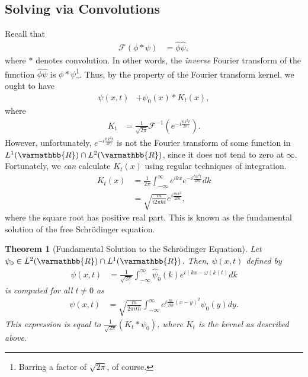 \documentclass[12pt]{extarticle}
\newcommand{\R}{\varmathbb{R}}
\theoremstyle{plain}
\newtheorem*{theorem}{Theorem}%
\theoremstyle{definition}
\theoremstyle{remark}
\begin{document}
  \subsection{Solving via Convolutions}%
  Recall that
  \begin{align*}
    \mathcal{F}(\phi \ast \psi) &= \hat{\phi}\hat{\psi},
  \end{align*}
  where $\ast$ denotes convolution. In other words, the \textit{inverse} Fourier transform of the function $\hat{\phi}\hat{\psi}$ is $\phi \ast \psi$\footnote{Barring a factor of $\sqrt{2\pi}$, of course.}. Thus, by the property of the Fourier transform kernel, we ought to have
  \begin{align*}
    \psi(x,t) &+ \psi_0(x)\ast K_t(x),
  \end{align*}
  where
  \begin{align*}
    K_t &= \frac{1}{\sqrt{2\pi}}\mathcal{F}^{-1}\left(e^{-i\frac{\hbar k^2 t}{2m}}\right).
  \end{align*}
  However, unfortunately, $e^{-i\frac{\hbar k^2 t}{2m}}$ is not the Fourier transform of some function in $L^{1}(\R)\cap L^{2}(\R)$, since it does not tend to zero at $\infty$. Fortunately, we \textit{can} calculate $K_t(x)$ using regular techniques of integration.
  \begin{align*}
    K_t(x) &= \frac{1}{2\pi}\int_{-\infty}^{\infty}e^{ikx}e^{-i\frac{\hbar k^2t}{2m}}dk\\
           &= \sqrt{\frac{m}{i2\pi \hbar t}}e^{i\frac{mx^2}{2t\hbar}},
  \end{align*}
  where the square root has positive real part. This is known as the fundamental solution of the free Schrödinger equation.
  \begin{theorem}[Fundamental Solution to the Schrödinger Equation]
    Let $\psi_0\in L^{2}(\R)\cap L^{1}(\R)$. Then, $\psi(x,t)$ defined by
    \begin{align*}
      \psi(x,t) &= \frac{1}{\sqrt{2\pi}} \int_{-\infty}^{\infty} \hat{\psi}_0(k)e^{i(kx - \omega(k)t)} dk
    \end{align*}
    is computed for all $t\neq 0$ as
    \begin{align*}
      \psi(x,t) &= \sqrt{\frac{m}{2\pi i t\hbar}}\int_{-\infty}^{\infty} e^{i\frac{m}{2t\hbar}(x-y)^2}\psi_0(y) dy.
    \end{align*}
    This expression is equal to $\frac{1}{\sqrt{2\pi}}\left(K_t\ast \psi_0\right)$, where $K_t$ is the kernel as described above.
  \end{theorem}
\end{document}

